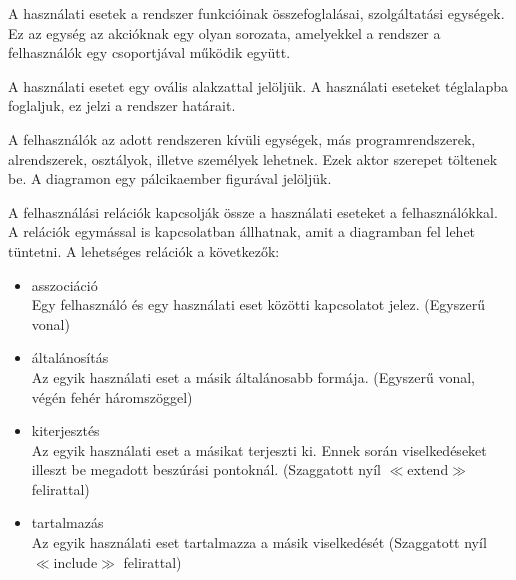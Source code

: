 \documentclass[margin=0px]{article}
\begin{document}
		A használati esetek a rendszer funkcióinak összefoglalásai, szolgáltatási
		egységek. Ez az egység az akcióknak egy olyan sorozata, amelyekkel
		a rendszer a felhasználók egy csoportjával működik együtt.
		
		A használati esetet egy ovális alakzattal jelöljük. A használati eseteket téglalapba foglaljuk, ez jelzi a rendszer határait.
		
		A felhasználók az adott rendszeren kívüli egységek, más programrendszerek,
		alrendszerek, osztályok, illetve személyek lehetnek. Ezek
		aktor szerepet töltenek be. A diagramon egy pálcikaember figurával jelöljük.
		
		A felhasználási relációk kapcsolják össze a használati eseteket a
		felhasználókkal. A relációk egymással is kapcsolatban állhatnak, amit
		a diagramban fel lehet tüntetni. A lehetséges relációk a következők:
		\begin{itemize}
			\item asszociáció \\
				Egy felhasználó és egy használati eset közötti kapcsolatot jelez. (Egyszerű vonal)
			\item általánosítás \\
				Az egyik használati eset a másik általánosabb formája. (Egyszerű vonal, végén fehér háromszöggel)
			\item kiterjesztés \\
				Az egyik használati eset a másikat terjeszti ki. Ennek
				során viselkedéseket illeszt be megadott beszúrási pontoknál. (Szaggatott nyíl $\ll$extend$\gg$ felirattal)
			\item tartalmazás \\
				Az egyik használati eset tartalmazza a másik viselkedését  (Szaggatott nyíl $\ll$include$\gg$ felirattal)
		\end{itemize}
\iffalse
		\begin{figure}[H]
			\centering
			\texttt{[image: img/hasznalatieset.png]}
			\caption{Használati esetek diagramja}
		\end{figure}
\fi
\end{document}
